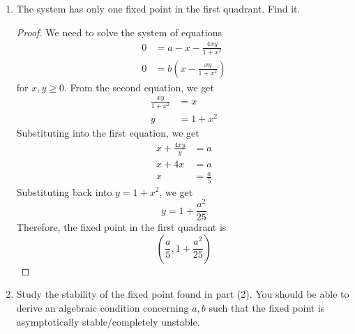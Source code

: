 \documentclass[../psets.tex]{subfiles}
\begin{document}
\begin{enumerate}
\begin{enumerate}
\begin{proof}
            For the points along the $y$-axis, we have $x=0$ and thus
            \begin{align*}
                \dv{x}{t} &= a\\
                \dv{y}{t} &= 0
            \end{align*}
            Thus, similarly, the vector field points inward toward first quadrant at every point along the $y$-axis. Thus, by the proposition from Lecture 7.2, since $f(x)$ is transversal to the boundary and inward pointing, the set is invariant.
        \end{proof}
        \item The system has only one fixed point in the first quadrant. Find it.
        \begin{proof}
            We need to solve the system of equations
            \begin{align*}
                0 &= a-x-\frac{4xy}{1+x^2}\\
                0 &= b\left( x-\frac{xy}{1+x^2} \right)
            \end{align*}
            for $x,y\geq 0$. From the second equation, we get
            \begin{align*}
                \frac{xy}{1+x^2} &= x\\
                y &= 1+x^2
            \end{align*}
            Substituting into the first equation, we get
            \begin{align*}
                x+\frac{4xy}{y} &= a\\
                x+4x &= a\\
                x &= \frac{a}{5}
            \end{align*}
            Substituting back into $y=1+x^2$, we get
            \begin{equation*}
                y = 1+\frac{a^2}{25}
            \end{equation*}
            Therefore, the fixed point in the first quadrant is
            \begin{equation*}
                \boxed{\left( \frac{a}{5},1+\frac{a^2}{25} \right)}
            \end{equation*}
        \end{proof}
        \item Study the stability of the fixed point found in part (2). You should be able to derive an algebraic condition concerning $a,b$ such that the fixed point is asymptotically stable/completely unstable.

\end{enumerate}
\end{enumerate}
\end{document}
